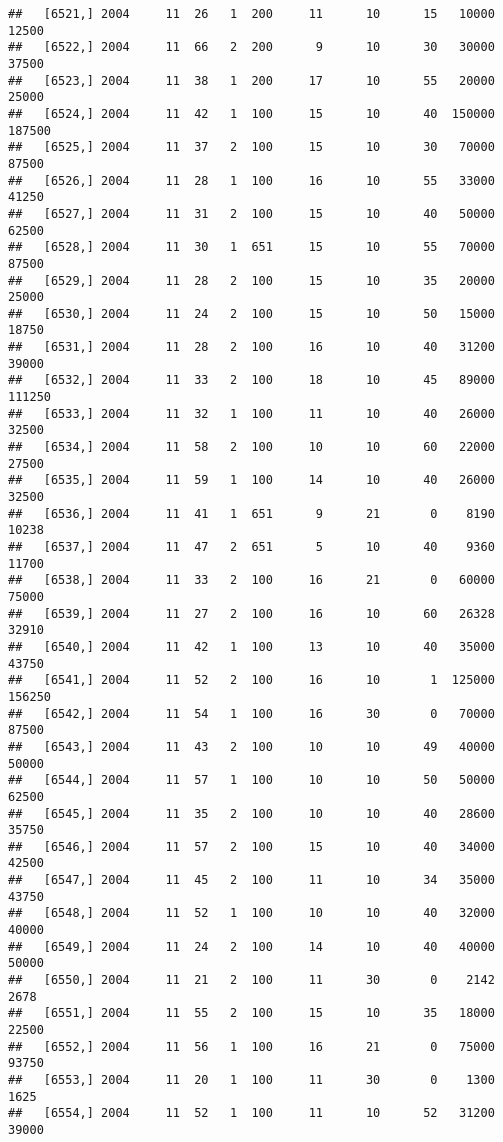 \documentclass{article}\usepackage[]{graphicx}\usepackage[]{color}
\makeatletter
\newenvironment{kframe}{%
 \def\at@end@of@kframe{}%
 \ifinner\ifhmode%
  \def\at@end@of@kframe{\end{minipage}}%
  \begin{minipage}{\columnwidth}%
 \fi\fi%
 \def\FrameCommand##1{\hskip\@totalleftmargin \hskip-\fboxsep
 \colorbox{shadecolor}{##1}\hskip-\fboxsep
     \hskip-\linewidth \hskip-\@totalleftmargin \hskip\columnwidth}%
 \MakeFramed {\advance\hsize-\width
   \@totalleftmargin\z@ \linewidth\hsize
   \@setminipage}}%
 {\par\unskip\endMakeFramed%
 \at@end@of@kframe}
\newenvironment{knitrout}{}{} %
\makeatother
\begin{document}
\begin{knitrout}
\begin{kframe}
\begin{verbatim}
##   [6521,] 2004     11  26   1  200     11      10      15   10000   12500
##   [6522,] 2004     11  66   2  200      9      10      30   30000   37500
##   [6523,] 2004     11  38   1  200     17      10      55   20000   25000
##   [6524,] 2004     11  42   1  100     15      10      40  150000  187500
##   [6525,] 2004     11  37   2  100     15      10      30   70000   87500
##   [6526,] 2004     11  28   1  100     16      10      55   33000   41250
##   [6527,] 2004     11  31   2  100     15      10      40   50000   62500
##   [6528,] 2004     11  30   1  651     15      10      55   70000   87500
##   [6529,] 2004     11  28   2  100     15      10      35   20000   25000
##   [6530,] 2004     11  24   2  100     15      10      50   15000   18750
##   [6531,] 2004     11  28   2  100     16      10      40   31200   39000
##   [6532,] 2004     11  33   2  100     18      10      45   89000  111250
##   [6533,] 2004     11  32   1  100     11      10      40   26000   32500
##   [6534,] 2004     11  58   2  100     10      10      60   22000   27500
##   [6535,] 2004     11  59   1  100     14      10      40   26000   32500
##   [6536,] 2004     11  41   1  651      9      21       0    8190   10238
##   [6537,] 2004     11  47   2  651      5      10      40    9360   11700
##   [6538,] 2004     11  33   2  100     16      21       0   60000   75000
##   [6539,] 2004     11  27   2  100     16      10      60   26328   32910
##   [6540,] 2004     11  42   1  100     13      10      40   35000   43750
##   [6541,] 2004     11  52   2  100     16      10       1  125000  156250
##   [6542,] 2004     11  54   1  100     16      30       0   70000   87500
##   [6543,] 2004     11  43   2  100     10      10      49   40000   50000
##   [6544,] 2004     11  57   1  100     10      10      50   50000   62500
##   [6545,] 2004     11  35   2  100     10      10      40   28600   35750
##   [6546,] 2004     11  57   2  100     15      10      40   34000   42500
##   [6547,] 2004     11  45   2  100     11      10      34   35000   43750
##   [6548,] 2004     11  52   1  100     10      10      40   32000   40000
##   [6549,] 2004     11  24   2  100     14      10      40   40000   50000
##   [6550,] 2004     11  21   2  100     11      30       0    2142    2678
##   [6551,] 2004     11  55   2  100     15      10      35   18000   22500
##   [6552,] 2004     11  56   1  100     16      21       0   75000   93750
##   [6553,] 2004     11  20   1  100     11      30       0    1300    1625
##   [6554,] 2004     11  52   1  100     11      10      52   31200   39000

\end{verbatim}
\end{kframe}
\end{knitrout}
\end{document}
